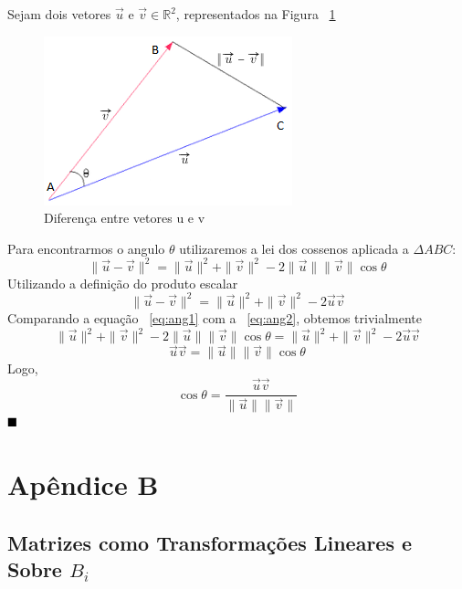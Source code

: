 \documentclass[a4paper,12pt]{article}
\begin{document}
\begin{itemize}
		Sejam dois vetores $\overrightarrow{u}$ e $\overrightarrow{v} \in \mathbb{R}^2$, representados na Figura ~\ref{fig:diffbtvet}
		\begin{figure}[H]
			\begin{center}
				\includegraphics[width=0.4\linewidth]{Angulovetoresnovo.png}
			\end{center}
			\caption{Diferença entre vetores u e v}
			\label{fig:diffbtvet}
		\end{figure}
		Para encontrarmos o angulo $\theta$ utilizaremos a lei dos cossenos aplicada a $\Delta ABC$:
		\begin{equation}
		\|\overrightarrow{u}-\overrightarrow{v}\|^{2}=\|\overrightarrow{u}\|^{2} + \|\overrightarrow{v}\|^{2} - 2\|\overrightarrow{u}\|\|\overrightarrow{v}\|\cos\theta
		\label{eq:ang1}
		\end{equation}
		Utilizando a definição do produto escalar \cite{GASteinbruch}
		\begin{equation}
		\|\overrightarrow{u}-\overrightarrow{v}\|^{2}=\|\overrightarrow{u}\|^{2} + \|\overrightarrow{v}\|^{2} - 2\overrightarrow{u}\overrightarrow{v}
		\label{eq:ang2}
		\end{equation}
		Comparando a equação ~\ref{eq:ang1} com a ~\ref{eq:ang2}, obtemos trivialmente
		$$
		\|\overrightarrow{u}\|^{2} + \|\overrightarrow{v}\|^{2} - 2\|\overrightarrow{u}\|\|\overrightarrow{v}\|\cos\theta = \|\overrightarrow{u}\|^{2} + \|\overrightarrow{v}\|^{2} - 2\overrightarrow{u}\overrightarrow{v}
		$$
		$$
		\overrightarrow{u}\overrightarrow{v} = \|\overrightarrow{u}\|\|\overrightarrow{v}\|\cos\theta
		$$
		Logo,
		$$
		\cos\theta = \frac{\overrightarrow{u}\overrightarrow{v}}{\|\overrightarrow{u}\|\|\overrightarrow{v}\|} 
		$$
		$\hfill\blacksquare$
	\end{itemize}
	
	\newpage
	\section*{Apêndice B} 
	\subsection*{Matrizes como Transformações Lineares e Sobre $B_i$}
	
\end{document}
